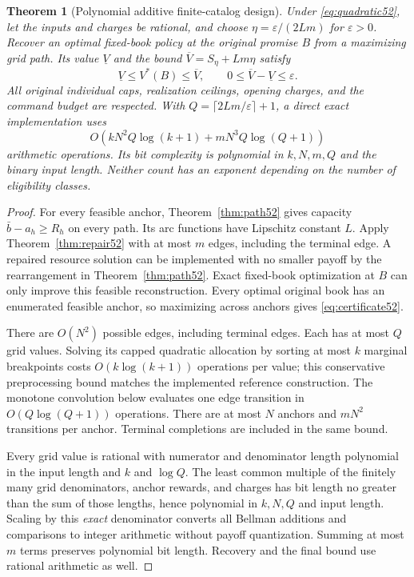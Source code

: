 \documentclass[11pt,letterpaper]{article}
\newtheorem{theorem}{Theorem}[section]
\theoremstyle{definition}\newtheorem{remark}[theorem]{Remark}
\begin{document}
\begin{theorem}[Polynomial additive finite-catalog design]\label{thm:approx52}
Under \eqref{eq:quadratic52}, let the inputs and charges be rational, and choose $\eta=\varepsilon/(2Lm)$ for $\varepsilon>0$. Recover an optimal fixed-book policy at the original promise $B$ from a maximizing grid path. Its value $\underline V$ and the bound $\overline V=S_\eta+Lm\eta$ satisfy
\begin{equation}\label{eq:certificate52}
 \underline V\leq V^*(B)\leq\overline V,\qquad 0\leq\overline V-\underline V\leq\varepsilon.
\end{equation}
All original individual caps, realization ceilings, opening charges, and the command budget are respected. With $Q=\lceil2Lm/\varepsilon\rceil+1$, a direct exact implementation uses
\begin{equation}\label{eq:complexity52}
 O\!\left(kN^2Q\log(k+1)+mN^3Q\log(Q+1)\right)
\end{equation}
arithmetic operations. Its bit complexity is polynomial in $k,N,m,Q$ and the binary input length. Neither count has an exponent depending on the number of eligibility classes.
\end{theorem}
\begin{proof}
For every feasible anchor, Theorem~\ref{thm:path52} gives capacity $\bar b-a_h\geq R_h$ on every path. Its arc functions have Lipschitz constant $L$. Apply Theorem~\ref{thm:repair52} with at most $m$ edges, including the terminal edge. A repaired resource solution can be implemented with no smaller payoff by the rearrangement in Theorem~\ref{thm:path52}. Exact fixed-book optimization at $B$ can only improve this feasible reconstruction. Every optimal original book has an enumerated feasible anchor, so maximizing across anchors gives \eqref{eq:certificate52}.

There are $O(N^2)$ possible edges, including terminal edges. Each has at most $Q$ grid values. Solving its capped quadratic allocation by sorting at most $k$ marginal breakpoints costs $O(k\log(k+1))$ operations per value; this conservative preprocessing bound matches the implemented reference construction. The monotone convolution below evaluates one edge transition in $O(Q\log(Q+1))$ operations. There are at most $N$ anchors and $mN^2$ transitions per anchor. Terminal completions are included in the same bound.

Every grid value is rational with numerator and denominator length polynomial in the input length and $k$ and $\log Q$. The least common multiple of the finitely many grid denominators, anchor rewards, and charges has bit length no greater than the sum of those lengths, hence polynomial in $k,N,Q$ and input length. Scaling by this \emph{exact} denominator converts all Bellman additions and comparisons to integer arithmetic without payoff quantization. Summing at most $m$ terms preserves polynomial bit length. Recovery and the final bound use rational arithmetic as well.
\end{proof}
\end{document}
